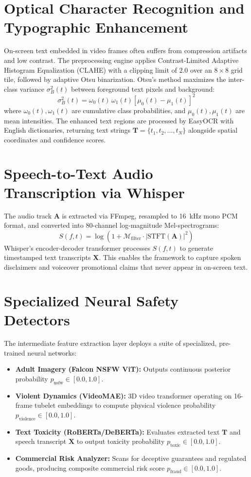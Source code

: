 \documentclass[12pt,a4paper]{report}
\begin{document}
\section{Optical Character Recognition and Typographic Enhancement}
On-screen text embedded in video frames often suffers from compression artifacts and low contrast. The preprocessing engine applies Contrast-Limited Adaptive Histogram Equalization (CLAHE) with a clipping limit of $2.0$ over an $8 \times 8$ grid tile, followed by adaptive Otsu binarization. Otsu's method maximizes the inter-class variance $\sigma_B^2(t)$ between foreground text pixels and background:
\begin{equation}
\sigma_B^2(t) = \omega_0(t) \, \omega_1(t) \left[ \mu_0(t) - \mu_1(t) \right]^2
\end{equation}
where $\omega_0(t), \omega_1(t)$ are cumulative class probabilities, and $\mu_0(t), \mu_1(t)$ are mean intensities. The enhanced text regions are processed by EasyOCR with English dictionaries, returning text strings $\mathbf{T} = \{t_1, t_2, \dots, t_N\}$ alongside spatial coordinates and confidence scores.

\section{Speech-to-Text Audio Transcription via Whisper}
The audio track $\mathbf{A}$ is extracted via FFmpeg, resampled to 16~kHz mono PCM format, and converted into 80-channel log-magnitude Mel-spectrograms:
\begin{equation}
S(f, t) = \log \left( 1 + \mathcal{M}_{\text{filter}} \cdot |\text{STFT}(\mathbf{A})|^2 \right)
\end{equation}
Whisper's encoder-decoder transformer processes $S(f, t)$ to generate timestamped text transcripts $\mathbf{X}$. This enables the framework to capture spoken disclaimers and voiceover promotional claims that never appear in on-screen text.

\section{Specialized Neural Safety Detectors}
The intermediate feature extraction layer deploys a suite of specialized, pre-trained neural networks:
\begin{itemize}
    \item \textbf{Adult Imagery (Falcon NSFW ViT):} Outputs continuous posterior probability $p_{\text{nsfw}} \in [0.0, 1.0]$.
    \item \textbf{Violent Dynamics (VideoMAE):} 3D video transformer operating on 16-frame tubelet embeddings to compute physical violence probability $p_{\text{violence}} \in [0.0, 1.0]$.
    \item \textbf{Text Toxicity (RoBERTa/DeBERTa):} Evaluates extracted text $\mathbf{T}$ and speech transcript $\mathbf{X}$ to output toxicity probability $p_{\text{toxic}} \in [0.0, 1.0]$.
    \item \textbf{Commercial Risk Analyzer:} Scans for deceptive guarantees and regulated goods, producing composite commercial risk score $p_{\text{fraud}} \in [0.0, 1.0]$.
\end{itemize}
\end{document}
